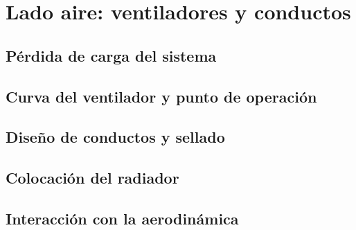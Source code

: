 \chapter{Lado aire: ventiladores y conductos}
\label{ch:lado_aire}

\begin{objetivos}
  \item {}
  \item {}
  \item {}
\end{objetivos}


\section{Pérdida de carga del sistema}
\label{sec:lado_aire:01}

\section{Curva del ventilador y punto de operación}
\label{sec:lado_aire:02}

\section{Diseño de conductos y sellado}
\label{sec:lado_aire:03}

\section{Colocación del radiador}
\label{sec:lado_aire:04}

\section{Interacción con la aerodinámica}
\label{sec:lado_aire:05}


